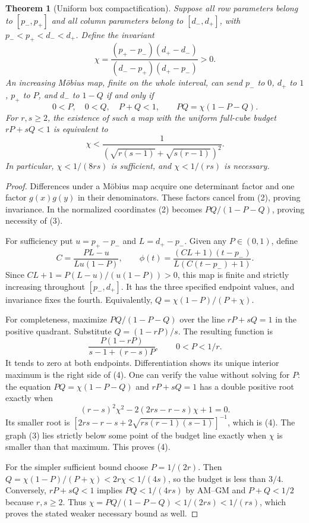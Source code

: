 \documentclass[11pt]{article}
\newtheorem{theorem}{Theorem}
\begin{document}
\begin{theorem}[Uniform box compactification]
Suppose all row parameters belong to $[p_-,p_+]$ and all column
parameters belong to $[d_-,d_+]$, with
$p_-<p_+<d_-<d_+$. Define the invariant
\[
 \chi=\frac{(p_+-p_-)(d_+-d_-)}{(d_--p_+)(d_+-p_-)}>0.
                                                               \tag{2}
\]
An increasing M\"obius map, finite on the whole interval, can send
$p_-$ to $0$, $d_+$ to $1$, $p_+$ to $P$, and $d_-$ to $1-Q$
if and only if
\[
 0<P,\quad0<Q,\quad P+Q<1,\qquad
 PQ=\chi(1-P-Q).                                             \tag{3}
\]
For $r,s\geq2$, the existence of such a map with the uniform
full-cube budget $rP+sQ<1$ is equivalent to
\[
 \chi<\frac{1}
 {(\sqrt{r(s-1)}+\sqrt{s(r-1)})^2}.                           \tag{4}
\]
In particular, $\chi<1/(8rs)$ is sufficient, and $\chi<1/(rs)$
is necessary.
\end{theorem}
\begin{proof}
Differences under a M\"obius map acquire one determinant factor and
one factor $g(x)g(y)$ in their denominators. These factors cancel
from (2), proving invariance. In the normalized coordinates (2)
becomes $PQ/(1-P-Q)$, proving necessity of (3).

For sufficiency put $u=p_+-p_-$ and $L=d_+-p_-$. Given any
$P\in(0,1)$, define
\[
 C=\frac{PL-u}{Lu(1-P)},\qquad
 \phi(t)=\frac{(CL+1)(t-p_-)}{L(C(t-p_-)+1)}.
\]
Since $CL+1=P(L-u)/(u(1-P))>0$, this map is finite and strictly
increasing throughout $[p_-,d_+]$. It has the three specified
endpoint values, and invariance fixes the fourth. Equivalently,
$Q=\chi(1-P)/(P+\chi)$.

For completeness, maximize $PQ/(1-P-Q)$ over the line
$rP+sQ=1$ in the positive quadrant. Substitute
$Q=(1-rP)/s$. The resulting function is
\[
 \frac{P(1-rP)}{s-1+(r-s)P},\qquad 0<P<1/r.
\]
It tends to zero at both endpoints. Differentiation shows its
unique interior maximum is the right side of (4). One can verify
the value without solving for $P$: the equation
$PQ=\chi(1-P-Q)$ and $rP+sQ=1$ has a double positive root exactly
when
\[
 (r-s)^2\chi^2-2(2rs-r-s)\chi+1=0.
\]
Its smaller root is
$[2rs-r-s+2\sqrt{rs(r-1)(s-1)}]^{-1}$, which is (4).
The graph (3) lies strictly below some point of the budget line
exactly when $\chi$ is smaller than that maximum. This proves (4).

For the simpler sufficient bound choose $P=1/(2r)$. Then
$Q=\chi(1-P)/(P+\chi)<2r\chi<1/(4s)$, so the budget is less than
$3/4$. Conversely, $rP+sQ<1$ implies $PQ<1/(4rs)$ by AM--GM and
$P+Q<1/2$ because $r,s\geq2$. Thus
$\chi=PQ/(1-P-Q)<1/(2rs)<1/(rs)$, which proves the stated weaker
necessary bound as well.
\end{proof}
\end{document}
